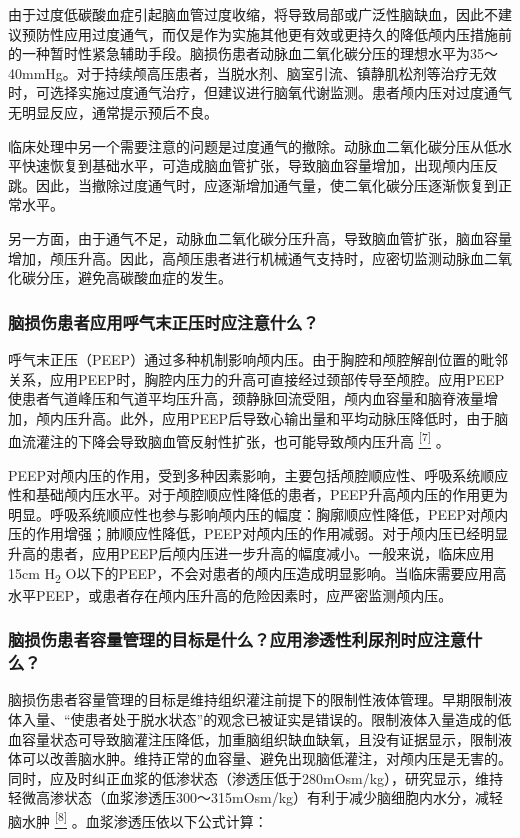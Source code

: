 由于过度低碳酸血症引起脑血管过度收缩，将导致局部或广泛性脑缺血，因此不建议预防性应用过度通气，而仅是作为实施其他更有效或更持久的降低颅内压措施前的一种暂时性紧急辅助手段。脑损伤患者动脉血二氧化碳分压的理想水平为35～40mmHg。对于持续颅高压患者，当脱水剂、脑室引流、镇静肌松剂等治疗无效时，可选择实施过度通气治疗，但建议进行脑氧代谢监测。患者颅内压对过度通气无明显反应，通常提示预后不良。

临床处理中另一个需要注意的问题是过度通气的撤除。动脉血二氧化碳分压从低水平快速恢复到基础水平，可造成脑血管扩张，导致脑血容量增加，出现颅内压反跳。因此，当撤除过度通气时，应逐渐增加通气量，使二氧化碳分压逐渐恢复到正常水平。

另一方面，由于通气不足，动脉血二氧化碳分压升高，导致脑血管扩张，脑血容量增加，颅压升高。因此，高颅压患者进行机械通气支持时，应密切监测动脉血二氧化碳分压，避免高碳酸血症的发生。

\subsubsection{脑损伤患者应用呼气末正压时应注意什么？}

呼气末正压（PEEP）通过多种机制影响颅内压。由于胸腔和颅腔解剖位置的毗邻关系，应用PEEP时，胸腔内压力的升高可直接经过颈部传导至颅腔。应用PEEP使患者气道峰压和气道平均压升高，颈静脉回流受阻，颅内血容量和脑脊液量增加，颅内压升高。此外，应用PEEP后导致心输出量和平均动脉压降低时，由于脑血流灌注的下降会导致脑血管反射性扩张，也可能导致颅内压升高
\protect\hyperlink{text00029.htmlux5cux23ch7-28}{\textsuperscript{{[}7{]}}}
。

PEEP对颅内压的作用，受到多种因素影响，主要包括颅腔顺应性、呼吸系统顺应性和基础颅内压水平。对于颅腔顺应性降低的患者，PEEP升高颅内压的作用更为明显。呼吸系统顺应性也参与影响颅内压的幅度：胸廓顺应性降低，PEEP对颅内压的作用增强；肺顺应性降低，PEEP对颅内压的作用减弱。对于颅内压已经明显升高的患者，应用PEEP后颅内压进一步升高的幅度减小。一般来说，临床应用15cm
H\textsubscript{2}
O以下的PEEP，不会对患者的颅内压造成明显影响。当临床需要应用高水平PEEP，或患者存在颅内压升高的危险因素时，应严密监测颅内压。

\subsubsection{脑损伤患者容量管理的目标是什么？应用渗透性利尿剂时应注意什么？}

脑损伤患者容量管理的目标是维持组织灌注前提下的限制性液体管理。早期限制液体入量、“使患者处于脱水状态”的观念已被证实是错误的。限制液体入量造成的低血容量状态可导致脑灌注压降低，加重脑组织缺血缺氧，且没有证据显示，限制液体可以改善脑水肿。维持正常的血容量、避免出现脑低灌注，对颅内压是无害的。同时，应及时纠正血浆的低渗状态（渗透压低于280mOsm/kg），研究显示，维持轻微高渗状态（血浆渗透压300～315mOsm/kg）有利于减少脑细胞内水分，减轻脑水肿
\protect\hyperlink{text00029.htmlux5cux23ch8-28}{\textsuperscript{{[}8{]}}}
。血浆渗透压依以下公式计算：

